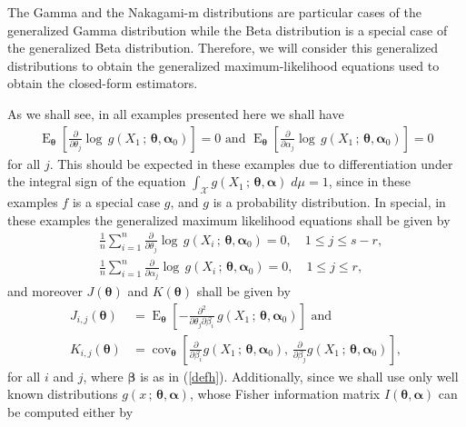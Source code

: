 \documentclass[10pt,a4paper,onecolumn]{article} %
\newcommand{\bs}{\boldsymbol}
\newcommand{\on}{\operatorname}
\begin{document}
The Gamma and the Nakagami-m distributions are particular cases of the generalized Gamma distribution while the Beta distribution is a special case of the generalized Beta distribution. Therefore, we will consider this generalized distributions to obtain the generalized maximum-likelihood equations used to obtain the closed-form estimators. 

As we shall see, in all examples presented here we shall have
\begin{equation}\label{allex}
\begin{aligned}\on{E}_{\bs{\theta}}\left[\frac{\partial}{\partial \theta_j}  \log\, g(X_1\,;\,\bs{\theta},\bs{\alpha}_0)\right] = 0\mbox{ and }
\on{E}_{\bs{\theta}}\left[\frac{\partial}{\partial \alpha_j}  \log\, g(X_1\,;\,\bs{\theta},\bs{\alpha}_0)\right] = 0
\end{aligned}
\end{equation}
for all $j$. This should be expected in these examples due to differentiation under the integral sign of the equation $\int_{\mathcal{X}}  g(X_1\,;\,\bs{\theta},\bs{\alpha})\; d\mu =1$, since in these examples $f$ is a special case $g$, and $g$ is a probability distribution. In special, in these examples the generalized maximum likelihood equations shall be given by
\begin{equation}\label{modified}
\begin{aligned}
&\frac{1}{n}\sum_{i=1}^n \frac{\partial}{\partial \theta_j}  \log\, g(X_i\,;\,\bs{\theta},\bs{\alpha}_0) = 0,\quad 1\leq j\leq s-r,\\ &\frac{1}{n}
\sum_{i=1}^n \frac{\partial}{\partial \alpha_j}  \log\, g(X_i\,;\,\bs{\theta},\bs{\alpha}_0)=0, \quad  1\leq j\leq r,
\end{aligned}
\end{equation}
and moreover  $J(\bs{\theta})$ and $K(\bs{\theta})$ shall be given by
 \begin{equation}\label{eqj}
 \begin{aligned}J_{i,j}(\bs{\theta})&=
 \on{E}_{\bs{\theta}} \left[-\frac{\partial^2}{\partial\theta_j\partial \beta_i}\, g(X_1\, ;\, \bs{\theta},\bs{\alpha}_0)\right]\mbox{ and}\\
 K_{i,j}(\bs{\theta}) &=  \on{cov}_{\bs{\theta}} \left[\frac{\partial}{\partial \beta_i} g(X_1\, ;\, \bs{\theta},\bs{\alpha}_0),\,  \frac{\partial}{\partial \beta_j} g(X_1\, ;\, \bs{\theta},\bs{\alpha}_0)\right],
 \end{aligned}
 \end{equation}
 for all $i$ and $j$, where $\bs{\beta}$ is as in (\ref{defh}). Additionally, since we shall use only well known distributions $g(x\,;\, \bs{\theta},\bs{\alpha})$, whose  Fisher information matrix $I(\bs{\theta},\bs{\alpha})$ can be computed either by
\end{document}
